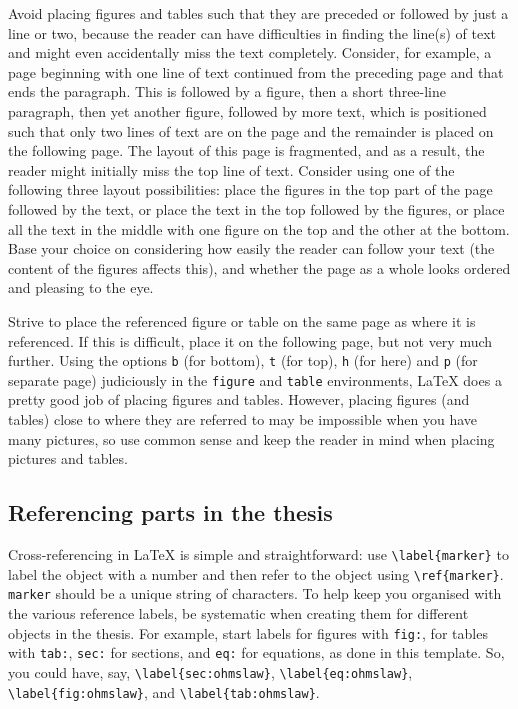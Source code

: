 \documentclass[english, 12pt, a4paper, sci, utf8, a-2b, online]{aaltothesis}
\begin{document}
Avoid placing figures and tables such that they are preceded or followed by just
a line or two, because the reader can have difficulties in finding the line(s) 
of text and might even accidentally miss the text completely. Consider, for 
example, a page beginning with one line of text continued from the preceding 
page and that ends the paragraph. This is followed by a figure, then a short 
three-line paragraph, then yet another figure, followed by more text, which is 
positioned such that only two lines of text are on the page and the remainder is
placed on the following page. The layout of this page is fragmented, and as a 
result, the reader might initially miss the top line of text. Consider using one
of the following three layout possibilities: place the figures in the top part 
of the page followed by the text, or place the text in the top followed by the 
figures, or place all the text in the middle with one figure on the top and the 
other at the bottom. Base your choice on considering how easily the reader can 
follow your text (the content of the figures affects this), and whether the page
as a whole looks ordered and pleasing to the eye.

Strive to place the referenced figure or table on the same page as where it is 
referenced. If this is difficult, place it on the following page, but not very 
much further. Using the options \texttt{b} (for bottom), \texttt{t} (for top), 
\texttt{h} (for here) and \texttt{p} (for separate page) judiciously in the 
\texttt{figure} and \texttt{table} environments, \LaTeX{} does a pretty good 
job of placing figures and tables. However, placing figures (and tables) close 
to where they are referred to may be impossible when you have many pictures, so 
use common sense and keep the reader in mind when placing pictures and tables.


\subsection{Referencing parts in the thesis}

Cross-referencing in \LaTeX{} is simple and straightforward: use 
\verb+\label{marker}+ to label the object with a number and then refer to the 
object using \verb+\ref{marker}+. \texttt{marker} should be a unique string of 
characters. To help keep you organised with the various reference labels, be 
systematic when creating them for different objects in the thesis. For example, 
start labels for figures with \texttt{fig:}, for tables with \texttt{tab:}, 
\texttt{sec:} for sections, and \texttt{eq:} for equations, as done in this 
template. So, you could have, say, \verb+\label{sec:ohmslaw}+, 
\verb+\label{eq:ohmslaw}+, \verb+\label{fig:ohmslaw}+, and 
\verb+\label{tab:ohmslaw}+.
\end{document}
